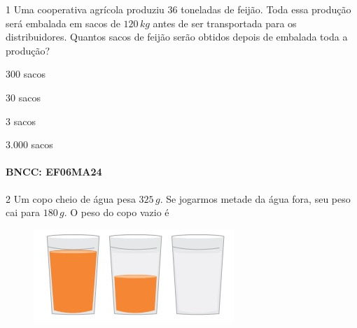 {

\num{1}  Uma cooperativa agrícola produziu $36$ toneladas de feijão. Toda essa
produção será embalada em sacos de $120\,kg$ antes de ser transportada para
os distribuidores. Quantos sacos de feijão serão obtidos depois de
embalada toda a produção?

\begin{escolha}
\item $300$ sacos
\item $30$ sacos
\item $3$ sacos
\item $3.000$ sacos
\end{escolha}

\paragraph{BNCC: EF06MA24 }


\num{2}  Um copo cheio de água pesa $325\,g$. Se jogarmos metade da água fora, seu
peso cai para $180\,g$. O peso do copo vazio é

\begin{figure}
\includegraphics[width=2.98958in,height=1.38542in]{./imgSAEB_6_MAT/media/image100.png}
\end{figure}

}
